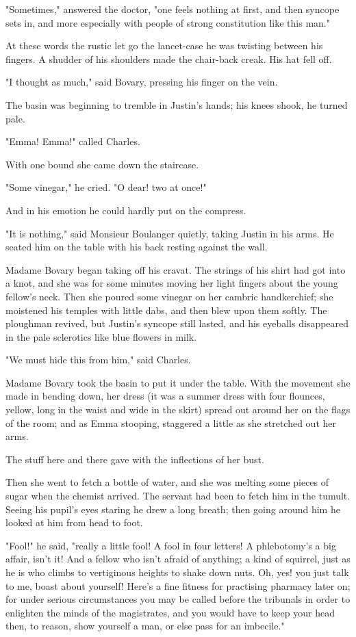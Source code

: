 \documentclass[11pt,twocolumn]{ltugboat}
\begin{document}
"Sometimes," answered the doctor, "one feels nothing at first, and then
syncope sets in, and more especially with people of strong constitution
like this man."

At these words the rustic let go the lancet-case he was twisting between
his fingers. A shudder of his shoulders made the chair-back creak. His
hat fell off.

"I thought as much," said Bovary, pressing his finger on the vein.

The basin was beginning to tremble in Justin's hands; his knees shook,
he turned pale.

"Emma! Emma!" called Charles.

With one bound she came down the staircase.

"Some vinegar," he cried. "O dear! two at once!"

And in his emotion he could hardly put on the compress.

"It is nothing," said Monsieur Boulanger quietly, taking Justin in his
arms. He seated him on the table with his back resting against the wall.

Madame Bovary began taking off his cravat. The strings of his shirt had
got into a knot, and she was for some minutes moving her light fingers
about the young fellow's neck. Then she poured some vinegar on her
cambric handkerchief; she moistened his temples with little dabs, and
then blew upon them softly. The ploughman revived, but Justin's syncope
still lasted, and his eyeballs disappeared in the pale sclerotics like
blue flowers in milk.

"We must hide this from him," said Charles.

Madame Bovary took the basin to put it under the table. With the
movement she made in bending down, her dress (it was a summer dress with
four flounces, yellow, long in the waist and wide in the skirt) spread
out around her on the flags of the room; and as Emma stooping, staggered
a little as she stretched out her arms.

The stuff here and there gave with the inflections of her bust.

Then she went to fetch a bottle of water, and she was melting some
pieces of sugar when the chemist arrived. The servant had been to
fetch him in the tumult. Seeing his pupil's eyes staring he drew a long
breath; then going around him he looked at him from head to foot.

"Fool!" he said, "really a little fool! A fool in four letters! A
phlebotomy's a big affair, isn't it! And a fellow who isn't afraid of
anything; a kind of squirrel, just as he is who climbs to vertiginous
heights to shake down nuts. Oh, yes! you just talk to me, boast about
yourself! Here's a fine fitness for practising pharmacy later on; for
under serious circumstances you may be called before the tribunals in
order to enlighten the minds of the magistrates, and you would have to
keep your head then, to reason, show yourself a man, or else pass for an
imbecile."
\end{document}
